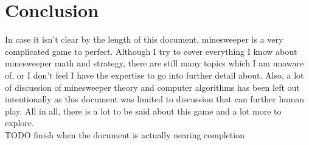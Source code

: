 \chapter{Conclusion}

In case it isn't clear by the length of this document, minesweeper is a very complicated game to perfect. Although I try to cover everything I know about minesweeper math and strategy, there are still many topics which I am unaware of, or I don't feel I have the expertise to go into further detail about. Also, a lot of discussion of minesweeper theory and computer algorithms has been left out intentionally as this document was limited to discussion that can further human play. All in all, there is a lot to be said about this game and a lot more to explore.\\

TODO finish when the document is actually nearing completion